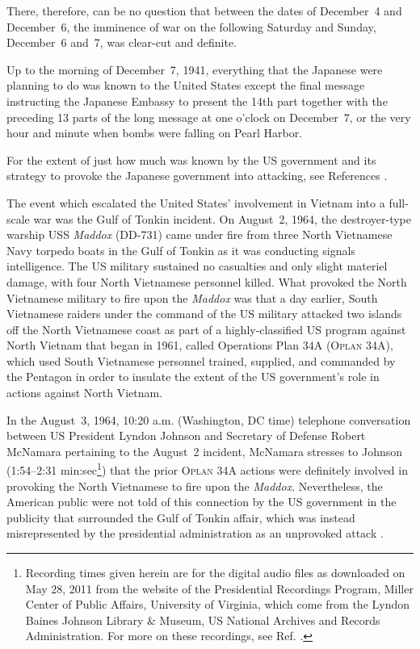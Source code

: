 \documentclass[letterpaper,12pt]{article}
\makeatletter
\newcommand{\asterism}{\smash{%
  \raisebox{-.5ex}{%
    \setlength{\tabcolsep}{-.5pt}%
    \begin{tabular}{@{}cc@{}}%
      \multicolumn2c*\\[-2ex]*&*%
    \end{tabular}}}}
\newenvironment{squotation}
  {\small\quotation}
  {\endquotation\normalsize}
\makeatother
\begin{document}
\begin{squotation}
There, therefore, can be no question that between the dates of December~4 and December~6, the imminence of war on the following Saturday and Sunday, December~6 and~7, was clear-cut and definite.

Up to the morning of December~7, 1941, everything that the Japanese were planning to do was known to the United States except the final message instructing the Japanese Embassy to present the 14th part together with the preceding 13 parts of the long message at one o'clock on December~7, or the very hour and minute when bombs were falling on Pearl Harbor.
\end{squotation}

For the extent of just how much was known by the US government and its strategy to provoke the Japanese government into attacking, see References .

\vspace{1em}
\centerline{\asterism}
\vspace{1em}

The event which escalated the United States' involvement in Vietnam into a full-scale war was the Gulf of Tonkin incident. On August~2, 1964, the destroyer-type warship USS \emph{Maddox} (DD-731) came under fire from three North Vietnamese Navy torpedo boats in the Gulf of Tonkin as it was conducting signals intelligence. The US military sustained no casualties and only slight materiel damage, with four North Vietnamese personnel killed. What provoked the North Vietnamese military to fire upon the \emph{Maddox} was that a day earlier, South Vietnamese raiders under the command of the US military attacked two islands off the North Vietnamese coast as part of a highly-classified US program against North Vietnam that began in 1961, called Operations Plan 34A (\textsc{Oplan} 34A), which used South Vietnamese personnel trained, supplied, and commanded by the Pentagon in order to insulate the extent of the US government's role in actions against North Vietnam.

In the August~3, 1964, 10:20 a.m. (Washington, DC time) telephone conversation between US President Lyndon Johnson and Secretary of Defense Robert McNamara \cite{JohnsonMcNamara1964-08-03am10-20} pertaining to the August~2 incident, McNamara stresses to Johnson (1:54--2:31 min:sec\footnote{Recording times given herein are for the digital audio files as downloaded on May 28, 2011 from the website of the Presidential Recordings Program, Miller Center of Public Affairs, University of Virginia, which come from the Lyndon Baines Johnson Library \& Museum, US National Archives and Records Administration. For more on these recordings, see Ref. .}) that the prior \textsc{Oplan} 34A actions were definitely involved in provoking the North Vietnamese to fire upon the \emph{Maddox}. Nevertheless, the American public were not told of this connection by the US government in the publicity that surrounded the Gulf of Tonkin affair, which was instead misrepresented by the presidential administration as an unprovoked attack \cite{Johnson1964-08-05SU}.
\end{document}
